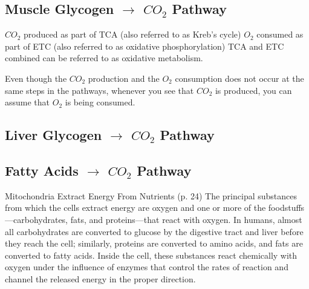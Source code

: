 \subsection{Muscle Glycogen $\rightarrow$ $CO_2$ Pathway}

$CO_2$ produced as part of TCA (also referred to as Kreb's cycle)
$O_2$ consumed as part of ETC (also referred to as oxidative phosphorylation)
TCA and ETC combined can be referred to as oxidative metabolism. 

Even though the $CO_2$ production and the $O_2$ consumption does not occur at the same steps in the pathways, whenever you see that $CO_2$ is produced, you can assume that $O_2$ is being consumed. 

\subsection{Liver Glycogen $\rightarrow$ $CO_2$ Pathway}

\subsection{Fatty Acids $\rightarrow$ $CO_2$ Pathway}



Mitochondria Extract Energy From Nutrients (p. 24) The principal substances from which the cells extract energy are oxygen and one or more of the foodstuffs—carbohydrates, fats, and proteins—that react with oxygen. In humans, almost all carbohydrates are converted to glucose by the digestive tract and liver before they reach the cell; similarly, proteins are converted to amino acids, and fats are converted to fatty acids. Inside the cell, these substances react chemically with oxygen under the influence of enzymes that control the rates of reaction and channel the released energy in the proper direction.

